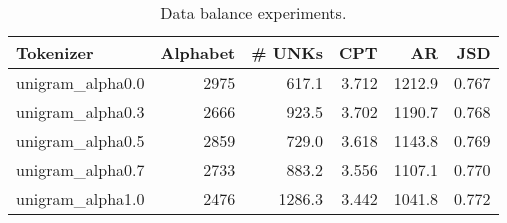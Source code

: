 \begin{table}
\caption{Data balance experiments.}
\label{tab:data_balance_metrics}
\begin{tabular}{lrrrrr}
\toprule
Tokenizer & Alphabet & \# UNKs & CPT & AR & JSD \\
\midrule
unigram\_alpha0.0 & 2975 & 617.1 & 3.712 & 1212.9 & 0.767 \\
unigram\_alpha0.3 & 2666 & 923.5 & 3.702 & 1190.7 & 0.768 \\
unigram\_alpha0.5 & 2859 & 729.0 & 3.618 & 1143.8 & 0.769 \\
unigram\_alpha0.7 & 2733 & 883.2 & 3.556 & 1107.1 & 0.770 \\
unigram\_alpha1.0 & 2476 & 1286.3 & 3.442 & 1041.8 & 0.772 \\
\bottomrule
\end{tabular}
\end{table}
